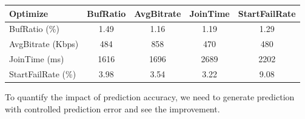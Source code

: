 \begin{table}[h!]
\begin{center}
\begin{small}
\begin{tabular}{l c c c c}
    Optimize             & BufRatio & AvgBitrate & JoinTime & StartFailRate \\ \hline
    BufRatio (\%)     & 1.49   & 1.16     & 1.19   & 1.29        \\ \hline
    AvgBitrate (Kbps)   & 484      & 858        & 470      & 480           \\ \hline
    JoinTime  (ms)    & 1616     & 1696       & 2689     & 2202          \\ \hline
    StartFailRate (\%) & 3.98   & 3.54     & 3.22   & 9.08        \\
\end{tabular}
\end{small}
\end{center}
\label{tab:cross-metrics}
\end{table}



\label{subsec:impact-accuracy}

To quantify the impact of prediction accuracy, we need to generate prediction with controlled prediction error and see the improvement. 


